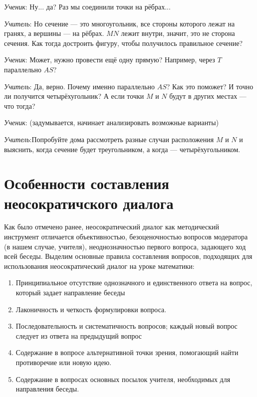 \documentclass[a4paper,14pt,russian]{extreport}
\begin{document}
\textit{Ученик}: Ну... да? Раз мы соединили точки на рёбрах...

\textit{Учитель}: Но сечение — это многоугольник, все стороны которого лежат на гранях, а вершины — на рёбрах. $MN$ лежит внутри, значит, это не сторона сечения. Как тогда достроить фигуру, чтобы получилось правильное сечение?

\textit{Ученик}: Может, нужно провести ещё одну прямую? Например, через $T$ параллельно $AS$?

\textit{Учитель}: Да, верно. Почему именно параллельно $AS$? Как это поможет? И точно ли получится четырёхугольник? А если точки $M$ и $N$ будут в других местах — что тогда?

\textit{Ученик}: (задумывается, начинает анализировать возможные варианты) 

\textit{Учитель}:Попробуйте дома рассмотреть разные случаи расположения $M$ и $N$ и выяснить, когда сечение будет треугольником, а когда — четырёхугольником.

\chapter*{Особенности составления неосократичского диалога}

Как было отмечено ранее, неосократический диалог как методический инструмент отличается объективностью, безоценочностью вопросов модератора (в нашем случае, учителя), неоднозначностью первого вопроса, задающего ход всей беседы. Выделим основные правила составления вопросов, подходящих для использования неосократический диалог на уроке математики:



\begin{enumerate}
    
\item	Принципиальное отсутствие однозначного и единственного ответа на вопрос,  который задает направление беседы
\item	Лаконичность и четкость формулировки вопроса.
\item	Последовательность и систематичность вопросов; каждый новый вопрос следует из ответа на предыдущий вопрос
\item Содержание в вопросе альтернативной точки зрения, помогающий найти противоречие или новую идею.
\item  Содержание в вопросах основных посылок учителя, необходимых для направления беседы.

\end{enumerate}
\end{document}
